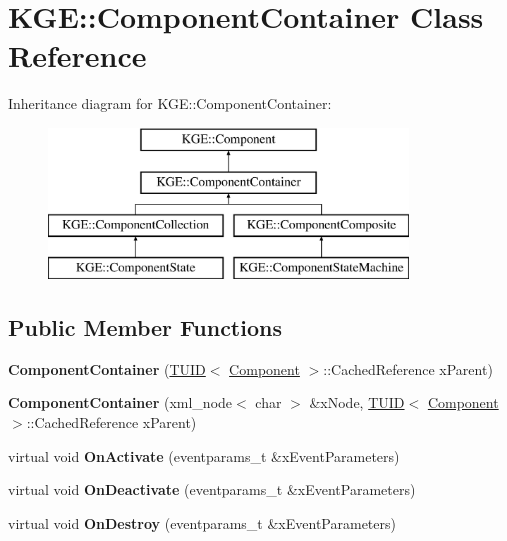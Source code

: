 \hypertarget{class_k_g_e_1_1_component_container}{\section{K\-G\-E\-:\-:Component\-Container Class Reference}
\label{class_k_g_e_1_1_component_container}
}
Inheritance diagram for K\-G\-E\-:\-:Component\-Container\-:\begin{figure}[H]
\begin{center}
\leavevmode
\includegraphics[height=4.000000cm]{class_k_g_e_1_1_component_container}
\end{center}
\end{figure}
\subsection*{Public Member Functions}
\begin{DoxyCompactItemize}
\item 
\hypertarget{class_k_g_e_1_1_component_container_ad12b900ef00af93b7c8560ec3195762e}{{\bfseries Component\-Container} (\hyperlink{class_k_g_e_1_1_t_u_i_d}{T\-U\-I\-D}$<$ \hyperlink{class_k_g_e_1_1_component}{Component} $>$\-::Cached\-Reference x\-Parent)}\label{class_k_g_e_1_1_component_container_ad12b900ef00af93b7c8560ec3195762e}

\item 
\hypertarget{class_k_g_e_1_1_component_container_aee612c9e180ebe71e6b46f8a8baf778d}{{\bfseries Component\-Container} (xml\-\_\-node$<$ char $>$ \&x\-Node, \hyperlink{class_k_g_e_1_1_t_u_i_d}{T\-U\-I\-D}$<$ \hyperlink{class_k_g_e_1_1_component}{Component} $>$\-::Cached\-Reference x\-Parent)}\label{class_k_g_e_1_1_component_container_aee612c9e180ebe71e6b46f8a8baf778d}

\item 
\hypertarget{class_k_g_e_1_1_component_container_af830c7777cc2bb5ee14453a53d34789e}{virtual void {\bfseries On\-Activate} (eventparams\-\_\-t \&x\-Event\-Parameters)}\label{class_k_g_e_1_1_component_container_af830c7777cc2bb5ee14453a53d34789e}

\item 
\hypertarget{class_k_g_e_1_1_component_container_a763825608230c978d6df1662793cb547}{virtual void {\bfseries On\-Deactivate} (eventparams\-\_\-t \&x\-Event\-Parameters)}\label{class_k_g_e_1_1_component_container_a763825608230c978d6df1662793cb547}

\item 
\hypertarget{class_k_g_e_1_1_component_container_ac8dd90ad88772cd83f0c2054cc65d918}{virtual void {\bfseries On\-Destroy} (eventparams\-\_\-t \&x\-Event\-Parameters)}\label{class_k_g_e_1_1_component_container_ac8dd90ad88772cd83f0c2054cc65d918}

\end{DoxyCompactItemize}
